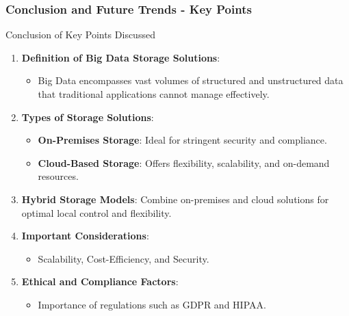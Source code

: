 \documentclass[aspectratio=169]{beamer}
\begin{document}
\begin{frame}[fragile]
    \frametitle{Conclusion and Future Trends - Key Points}
    \begin{block}{Conclusion of Key Points Discussed}
        \begin{enumerate}
            \item \textbf{Definition of Big Data Storage Solutions}:
                \begin{itemize}
                    \item Big Data encompasses vast volumes of structured and unstructured data that traditional applications cannot manage effectively.
                \end{itemize}
            \item \textbf{Types of Storage Solutions}:
                \begin{itemize}
                    \item \textbf{On-Premises Storage}: Ideal for stringent security and compliance.
                    \item \textbf{Cloud-Based Storage}: Offers flexibility, scalability, and on-demand resources.
                \end{itemize}
            \item \textbf{Hybrid Storage Models}: Combine on-premises and cloud solutions for optimal local control and flexibility.
            \item \textbf{Important Considerations}:
                \begin{itemize}
                    \item Scalability, Cost-Efficiency, and Security.
                \end{itemize}
            \item \textbf{Ethical and Compliance Factors}:
                \begin{itemize}
                    \item Importance of regulations such as GDPR and HIPAA.
                \end{itemize}
        \end{enumerate}
    \end{block}
\end{frame}
\end{document}
